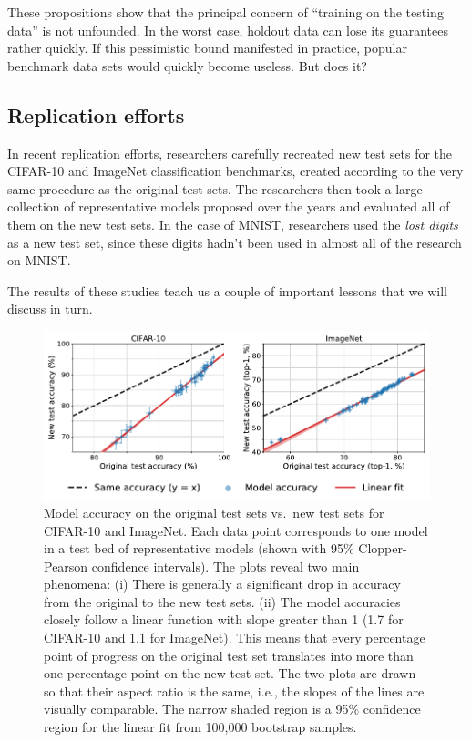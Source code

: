 \documentclass{tufte-book}
\begin{document}
These propositions show that the principal concern of ``training on the
testing data'' is not unfounded. In the worst case, holdout data can
lose its guarantees rather quickly. If this pessimistic bound manifested
in practice, popular benchmark data sets would quickly become useless.
But does it?

\hypertarget{replication-efforts}{%
\subsection{Replication efforts}\label{replication-efforts}}

In recent replication efforts, researchers carefully recreated new test
sets for the CIFAR-10 and ImageNet classification benchmarks, created
according to the very same procedure as the original test sets. The
researchers then took a large collection of representative models
proposed over the years and evaluated all of them on the new test sets.
In the case of MNIST, researchers used the \emph{lost digits} as a new
test set, since these digits hadn't been used in almost all of the
research on MNIST.

The results of these studies teach us a couple of important lessons that
we will discuss in turn.

\begin{figure}
\centering
\includegraphics[width=1\textwidth,height=\textheight]{assets/repl-cifar-imagenet}
\caption{Model accuracy on the original test sets vs.~new test sets for
CIFAR-10 and ImageNet. Each data point corresponds to one model in a
test bed of representative models (shown with 95\% Clopper-Pearson
confidence intervals). The plots reveal two main phenomena: (i) There is
generally a significant drop in accuracy from the original to the new
test sets. (ii) The model accuracies closely follow a linear function
with slope greater than 1 (1.7 for CIFAR-10 and 1.1 for ImageNet). This
means that every percentage point of progress on the original test set
translates into more than one percentage point on the new test set. The
two plots are drawn so that their aspect ratio is the same, i.e., the
slopes of the lines are visually comparable. The narrow shaded region is
a 95\% confidence region for the linear fit from 100,000 bootstrap
samples.}
\end{figure}
\end{document}
